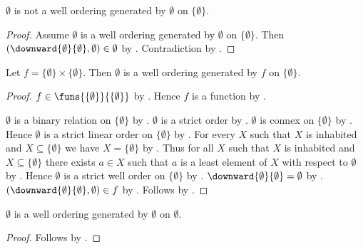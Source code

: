 


\begin{proposition}\label{test_empty_graph_not_generated_one_point}
    $\emptyset$ is not a well ordering generated by $\emptyset$ on
        $\{\emptyset\}$.
\end{proposition}
\begin{proof}
    Assume $\emptyset$ is a well ordering generated by $\emptyset$ on
        $\{\emptyset\}$.
    Then $(\downward{\emptyset}{\emptyset},\emptyset)\in\emptyset$
        by .
    Contradiction by .
\end{proof}

\begin{proposition}\label{test_one_entry_graph_generated_one_point}
    Let $f=\{\emptyset\}\times\{\emptyset\}$.
    Then $\emptyset$ is a well ordering generated by $f$ on
        $\{\emptyset\}$.
\end{proposition}
\begin{proof}
    $f\in\funs{\{\emptyset\}}{\{\emptyset\}}$
        by .
    Hence $f$ is a function by .

    $\emptyset$ is a binary relation on $\{\emptyset\}$
        by .
    $\emptyset$ is a strict order
        by .
    $\emptyset$ is connex on $\{\emptyset\}$
        by .
    Hence $\emptyset$ is a strict linear order on $\{\emptyset\}$
        by .
    For every $X$ such that $X$ is inhabited and
        $X\subseteq\{\emptyset\}$ we have $X=\{\emptyset\}$
        by .
    Thus for all $X$ such that $X$ is inhabited and
        $X\subseteq\{\emptyset\}$ there exists $a\in X$ such that
        $a$ is a least element of $X$ with respect to $\emptyset$
        by .
    Hence $\emptyset$ is a strict well order on $\{\emptyset\}$
        by .
    $\downward{\emptyset}{\emptyset}=\emptyset$
        by .
    $(\downward{\emptyset}{\emptyset},\emptyset)\in f$
        by .
    Follows by .
\end{proof}

\begin{proposition}\label{test_empty_graph_generated_empty_order}
    $\emptyset$ is a well ordering generated by $\emptyset$ on $\emptyset$.
\end{proposition}
\begin{proof}
    Follows by
        .
\end{proof}

